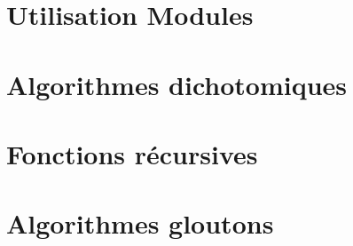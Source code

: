 \section*{Utilisation Modules}
%
%

\section*{Algorithmes dichotomiques}
\renewcommand{\repExo}{../../Informatique/S1_Themes/04_AlgorithmesDichotomiques}

\renewcommand{\td}{01_RechercheDichotomique}
\graphicspath{{\repStyle/png/}{\repExo/\td/images/}}


\renewcommand{\td}{02_ExponentiationRapide}
\graphicspath{{\repStyle/png/}{\repExo/\td/images/}}


\section*{Fonctions récursives}
\renewcommand{\repExo}{../../Informatique/S1_Themes/05_FonctionsRecursives}

\renewcommand{\td}{01_AlgorithmesDichotomiques}
\graphicspath{{\repStyle/png/}{\repExo/\td/images/}}


\renewcommand{\td}{02_FiguresAlphaNumeriques}
\graphicspath{{\repStyle/png/}{\repExo/\td/images/}}


\renewcommand{\td}{03_Fractales}
\graphicspath{{\repStyle/png/}{\repExo/\td/images/}}


\renewcommand{\td}{04_EnumerationListes}
\graphicspath{{\repStyle/png/}{\repExo/\td/images/}}


\section*{Algorithmes gloutons}
\renewcommand{\repExo}{../../Informatique/S1_Themes/06_Gloutons}

\renewcommand{\td}{01_RenduMonnaie}
\graphicspath{{\repStyle/png/}{\repExo/\td/images/}}


\renewcommand{\td}{02_AllocationSalles}
\graphicspath{{\repStyle/png/}{\repExo/\td/images/}}



